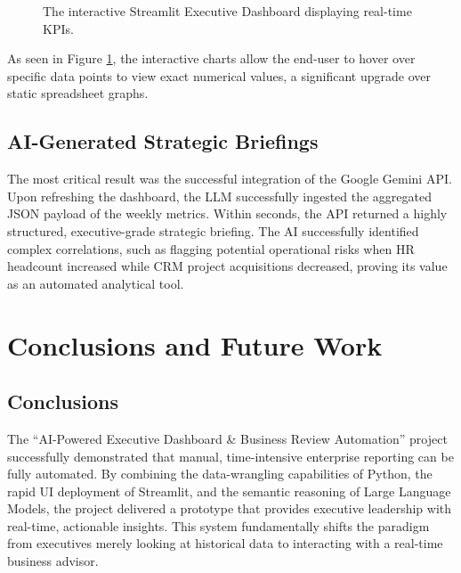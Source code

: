 \documentclass{book}
\begin{document}
\begin{figure}[h]
    \centering
    
    \vspace{6cm} 
    
    \caption{The interactive Streamlit Executive Dashboard displaying real-time KPIs.}
    \label{fig:dashboard1}
\end{figure}

As seen in Figure \ref{fig:dashboard1}, the interactive charts allow the end-user to hover over specific data points to view exact numerical values, a significant upgrade over static spreadsheet graphs.

\section{AI-Generated Strategic Briefings}
The most critical result was the successful integration of the Google Gemini API. Upon refreshing the dashboard, the LLM successfully ingested the aggregated JSON payload of the weekly metrics. Within seconds, the API returned a highly structured, executive-grade strategic briefing. The AI successfully identified complex correlations, such as flagging potential operational risks when HR headcount increased while CRM project acquisitions decreased, proving its value as an automated analytical tool.


\chapter{Conclusions and Future Work}

\section{Conclusions}
The ``AI-Powered Executive Dashboard \& Business Review Automation'' project successfully demonstrated that manual, time-intensive enterprise reporting can be fully automated. By combining the data-wrangling capabilities of Python, the rapid UI deployment of Streamlit, and the semantic reasoning of Large Language Models, the project delivered a prototype that provides executive leadership with real-time, actionable insights. This system fundamentally shifts the paradigm from executives merely looking at historical data to interacting with a real-time business advisor.
\end{document}
